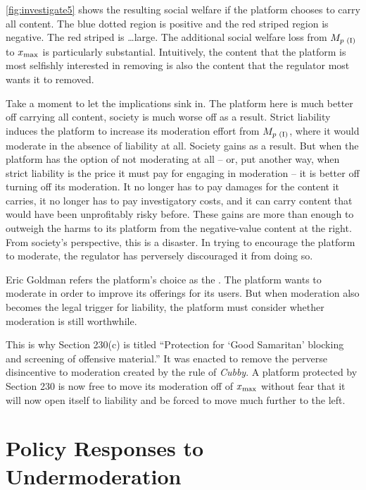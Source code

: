 \autoref{fig:investigate5} shows the resulting social welfare if the platform chooses to carry all content. The blue dotted region is positive and the red striped region is negative. The red striped is \ldots large. The additional social welfare loss from $M_{p \text{ (I)}}$ to $x_{\text{max}}$ is particularly substantial. Intuitively, the content that the platform is most selfishly interested in removing is also the content that the regulator most wants it to removed.

Take a moment to let the implications sink in. The platform here is much better off carrying all content, society is much worse off as a result. Strict liability induces the platform to increase its moderation effort from $M_{p \text{ (I)}}$, where it would moderate in the absence of liability at all. Society gains as a result. But when the platform has the option of not moderating at all -- or, put another way, when strict liability is the price it must pay for engaging in moderation -- it is better off turning off its moderation. It no longer has to pay damages for the content it carries, it no longer has to pay investigatory costs, and it can carry content that would have been unprofitably risky before. These gains are more than enough to outweigh the harms to its platform from the negative-value content at the right. From society's perspective, this is a disaster. In trying to encourage the platform to moderate, the regulator has perversely discouraged it from doing so.

Eric Goldman refers the platform's choice as the . The platform wants to moderate in order to improve its offerings for its users. But when moderation also becomes the legal trigger for liability, the platform must consider whether moderation is still worthwhile.

This is why Section 230(c) is titled ``Protection for `Good Samaritan' blocking and screening of offensive material.'' It was enacted to remove the perverse disincentive to moderation created by the rule of \emph{Cubby}. A platform protected by Section 230 is now free to move its moderation off of $x_{\text{max}}$ without fear that it will now open itself to liability and be forced to move much further to the left.






\section{Policy Responses to Undermoderation}
\label{sec:undermoderation}

